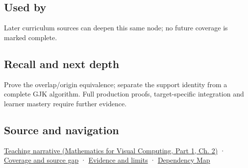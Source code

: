 \subsection{Used by}\label{appendix-215ac7099a82-used-by}

\hypertarget{appendix-215ac7099a82-used-by}{}

Later curriculum sources can deepen this same node; no future coverage is marked complete.

\subsection{Recall and next depth}\label{appendix-215ac7099a82-recall-and-next-depth}

\hypertarget{appendix-215ac7099a82-recall-and-next-depth}{}

Prove the overlap/origin equivalence; separate the support identity from a complete GJK algorithm. Full production proofs, target-specific integration and learner mastery require further evidence.

\subsection{Source and navigation}\label{appendix-215ac7099a82-source-and-navigation}

\hypertarget{appendix-215ac7099a82-source-and-navigation}{}

\href{../02-Mathematics-for-Visual-Computing-P01/main.pdf\#nameddest=01-foundations-i-ch018-weighted-points-lead-from-affine-geometry-to-collision-shapes}{Teaching narrative (Mathematics for Visual Computing, Part 1, Ch. 2)} · \hyperref[appendix-fd090d982a15-phase-6---parts-501-600]{Coverage and source gap} · \hyperref[appendix-a103e7846d21-phase-6---source-analysis-and-verification]{Evidence and limits} · \hyperref[appendix-4ad47bdd269a]{Dependency Map}
